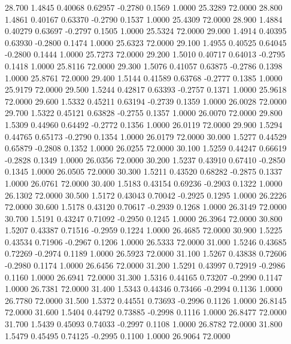   28.700   1.4845   0.40068   0.62957  -0.2780   0.1569   1.0000  25.3289  72.0000
  28.800   1.4861   0.40167   0.63370  -0.2790   0.1537   1.0000  25.4309  72.0000
  28.900   1.4884   0.40279   0.63697  -0.2797   0.1505   1.0000  25.5324  72.0000
  29.000   1.4914   0.40395   0.63930  -0.2800   0.1474   1.0000  25.6323  72.0000
  29.100   1.4955   0.40525   0.64045  -0.2800   0.1444   1.0000  25.7273  72.0000
  29.200   1.5010   0.40717   0.64013  -0.2795   0.1418   1.0000  25.8116  72.0000
  29.300   1.5076   0.41057   0.63875  -0.2786   0.1398   1.0000  25.8761  72.0000
  29.400   1.5144   0.41589   0.63768  -0.2777   0.1385   1.0000  25.9179  72.0000
  29.500   1.5244   0.42817   0.63393  -0.2757   0.1371   1.0000  25.9618  72.0000
  29.600   1.5332   0.45211   0.63194  -0.2739   0.1359   1.0000  26.0028  72.0000
  29.700   1.5322   0.45121   0.63828  -0.2755   0.1357   1.0000  26.0070  72.0000
  29.800   1.5309   0.44960   0.64492  -0.2772   0.1356   1.0000  26.0119  72.0000
  29.900   1.5294   0.44765   0.65173  -0.2790   0.1354   1.0000  26.0179  72.0000
  30.000   1.5277   0.44529   0.65879  -0.2808   0.1352   1.0000  26.0255  72.0000
  30.100   1.5259   0.44247   0.66619  -0.2828   0.1349   1.0000  26.0356  72.0000
  30.200   1.5237   0.43910   0.67410  -0.2850   0.1345   1.0000  26.0505  72.0000
  30.300   1.5211   0.43520   0.68282  -0.2875   0.1337   1.0000  26.0761  72.0000
  30.400   1.5183   0.43154   0.69236  -0.2903   0.1322   1.0000  26.1302  72.0000
  30.500   1.5172   0.43043   0.70042  -0.2925   0.1295   1.0000  26.2226  72.0000
  30.600   1.5178   0.43120   0.70617  -0.2939   0.1268   1.0000  26.3149  72.0000
  30.700   1.5191   0.43247   0.71092  -0.2950   0.1245   1.0000  26.3964  72.0000
  30.800   1.5207   0.43387   0.71516  -0.2959   0.1224   1.0000  26.4685  72.0000
  30.900   1.5225   0.43534   0.71906  -0.2967   0.1206   1.0000  26.5333  72.0000
  31.000   1.5246   0.43685   0.72269  -0.2974   0.1189   1.0000  26.5923  72.0000
  31.100   1.5267   0.43838   0.72606  -0.2980   0.1174   1.0000  26.6456  72.0000
  31.200   1.5291   0.43997   0.72919  -0.2986   0.1160   1.0000  26.6941  72.0000
  31.300   1.5316   0.44165   0.73207  -0.2990   0.1147   1.0000  26.7381  72.0000
  31.400   1.5343   0.44346   0.73466  -0.2994   0.1136   1.0000  26.7780  72.0000
  31.500   1.5372   0.44551   0.73693  -0.2996   0.1126   1.0000  26.8145  72.0000
  31.600   1.5404   0.44792   0.73885  -0.2998   0.1116   1.0000  26.8477  72.0000
  31.700   1.5439   0.45093   0.74033  -0.2997   0.1108   1.0000  26.8782  72.0000
  31.800   1.5479   0.45495   0.74125  -0.2995   0.1100   1.0000  26.9064  72.0000
